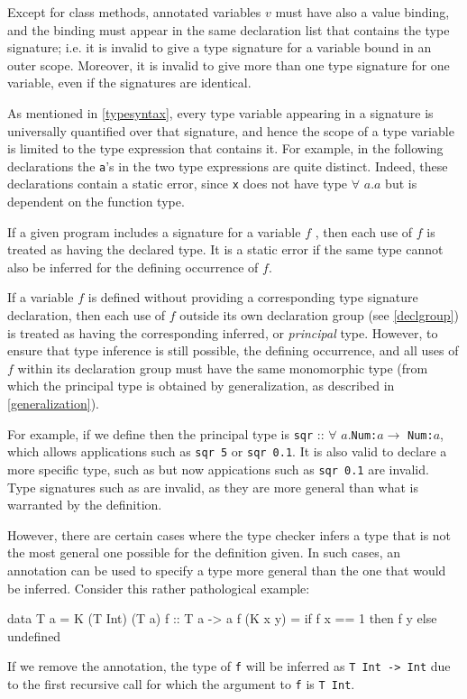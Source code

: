 Except for class methods, annotated variables $v$ must have also a value binding, and the binding must appear in the same declaration list that contains the type signature; i.e. it is invalid
to give a type signature for a variable bound in an outer scope. Moreover, it is invalid to give more than one type signature for one variable, even if the signatures are identical.

As mentioned in \autoref{typesyntax}, every type variable appearing in a signature is universally quantified over that signature, and hence the scope of a type variable is limited to the type expression that contains it.
For example, in the following declarations 
the \texttt{a}'s in the two type expressions are quite distinct.
Indeed, these declarations contain a static error, since \texttt{x} does not have type $\forall$ $a$.$a$ but is dependent on the function type.

If a given program includes a signature for a variable $f$ , then each use of $f$ is treated as having the declared type.
It is a static error if the same type cannot also be inferred for the defining occurrence of $f$.

If a variable $f$ is defined without providing a corresponding type signature declaration, then each use of $f$ outside its own declaration group (see \autoref{declgroup}) is treated as having the corresponding inferred, or \emph{principal} type.
However, to ensure that type inference is still possible, the defining occurrence, and all uses of $f$ within its declaration group must have the same monomorphic type (from which the principal type is obtained by generalization, as described in \autoref{generalization}).

For example, if we define 
then the principal type is \texttt{sqr} :: $\forall$ $a$.\texttt{Num:}$a \rightarrow{}$ \texttt{Num:}$a$, which allows applications such as \texttt{sqr 5} or \texttt{sqr 0.1}.
It is also valid to declare a more specific type, such as  but now appications such as \texttt{sqr 0.1} are invalid. Type signatures such as  are invalid, as they are more general than what is warranted by the definition.

However, there are certain cases where the type checker infers a type that is not the most general one possible for the definition given. In such cases, an annotation can be used to specify a type more general than the one that would be inferred. Consider this rather pathological example:
\begin{code}
data T a = K (T Int) (T a)
f :: T a -> a
f (K x y) = if f x == 1 then f y else undefined
\end{code}
If we remove the annotation, the type of \texttt{f} will be inferred as \texttt{T Int -> Int} due to the first recursive call for which the argument to \texttt{f} is \texttt{T Int}.

